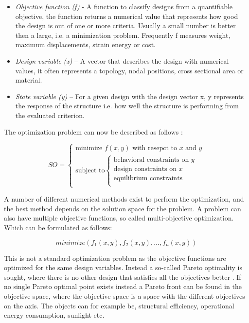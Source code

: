 \begin{itemize} 
\item \textit{Objective function (f) }- A function to classify designs from a quantifiable objective, the function returns a numerical value that represents how good the design is out of one or more criteria. Usually a small number is better then a large, i.e. a minimization problem. Frequently f measures weight, maximum displacements, strain energy or cost.
\item \textit{Design variable (x)} – A vector that describes the design with numerical values, it often represents a topology, nodal positions, cross sectional area or material.
\item \textit{State variable (y)} – For a given design with the design vector x, y represents the response of the structure i.e. how well the structure is performing from the evaluated criterion.
\end{itemize} 

The optimization problem can now be described as follows \cite{christensen2008introduction} :

\begin{equation}
SO=\begin{cases}
    \textrm{minimize } f(x,y) \textrm{ with resepct to } x \textrm{ and } y \\
    {\textrm{subject to} \begin{cases}
        \textrm{behavioral constraints on } y\\
        \textrm{design constraints on } x\\
	\textrm{equilibrium constraints} \\
    \end{cases}}
      \end{cases}
    \end{equation} 


 A number of different numerical methods exist to perform the optimization, and the best method depends on the solution space for the problem. A problem can also have multiple objective functions, so called multi-objective optimization. Which can be formulated as follows:

\begin{equation*}
minimize(f_1(x,y),f_2(x,y), \dotsc, f_n(x,y))
\end{equation*}

This is not a standard optimization problem as the objective functions are optimized for the same design variables. Instead a so-called Pareto optimality is sought, where there is no other design that satisfies all the objectives better \cite{christensen2008introduction}. If no single Pareto optimal point exists instead a Pareto front can be found in the objective space, where the objective space is a space with the different objectives on the axis. The objects can for example be, structural efficiency, operational energy consumption, sunlight etc.

